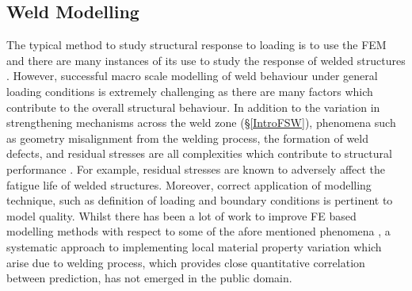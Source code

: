 \subsection{Weld Modelling}
\label{IntroWeldeModelling}
The typical method to study structural response to loading is to use the FEM and there are many instances of its use to study the response of welded structures \cite{Grujicic2011,McWilliams2013,Reis2004,Zhao2001}. However, successful macro scale modelling of weld behaviour under general loading conditions is extremely challenging as there are many factors which contribute to the overall structural behaviour. In addition to the variation in strengthening mechanisms across the weld zone (\S\ref{IntroFSW}), phenomena such as geometry misalignment from the welding process, the formation of weld defects, and residual stresses are all complexities which contribute to structural performance \cite{Kim2010,Grujicic2011a}. For example, residual stresses are known to adversely affect the fatigue life of welded structures. Moreover, correct application of modelling technique, such as definition of loading and boundary conditions is pertinent to model quality.  Whilst there has been a lot of work to improve FE based modelling methods with respect to some of the afore mentioned phenomena \cite{Zadpoor2009,McWilliams2013,Grujicic2011,Grujicic2010a}, a systematic approach to implementing local material property variation which arise due to welding process, which provides close quantitative correlation between prediction, has not emerged in the public domain. 

